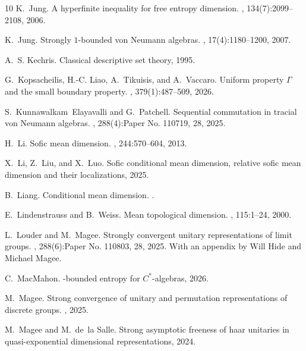 \documentclass[10pt]{amsart}
\theoremstyle{definition}
\numberwithin{equation}{section}
\begin{document}
\begin{thebibliography}{10}
K.~Jung.
\newblock A hyperfinite inequality for free entropy dimension.
, 134(7):2099--2108, 2006.

K.~Jung.
\newblock Strongly $1$-bounded von {N}eumann algebras.
, 17(4):1180--1200, 2007.

A.~S. Kechris.
\newblock Classical descriptive set theory, 1995.

G.~Kopsacheilis, H.-C. Liao, A.~Tikuisis, and A.~Vaccaro.
\newblock Uniform property {$\Gamma$} and the small boundary property.
, 379(1):487--509, 2026.

S.~Kunnawalkam~Elayavalli and G.~Patchell.
\newblock Sequential commutation in tracial von {N}eumann algebras.
, 288(4):Paper No. 110719, 28, 2025.

H.~Li.
\newblock Sofic mean dimension.
, 244:570--604, 2013.

X.~Li, Z.~Liu, and X.~Luo.
\newblock Sofic conditional mean dimension, relative sofic mean dimension and their localizations, 2025.

B.~Liang.
\newblock Conditional mean dimension.
.

E.~Lindenstrauss and B.~Weiss.
\newblock Mean topological dimension.
, 115:1--24, 2000.

L.~Louder and M.~Magee.
\newblock Strongly convergent unitary representations of limit groups.
, 288(6):Paper No. 110803, 28, 2025.
\newblock With an appendix by Will Hide and Michael Magee.

C.~MacMahon.
-bounded entropy for ${C}^*$-algebras, 2026.

M.~Magee.
\newblock Strong convergence of unitary and permutation representations of discrete groups.
, 2025.

M.~Magee and M.~de~la Salle.
\newblock Strong asymptotic freeness of haar unitaries in quasi-exponential dimensional representations, 2024.


\end{thebibliography}
\end{document}
